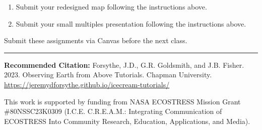 \documentclass[oneside,a4paper,11pt,explicit]{book}
\begin{document}
\begin{tcolorbox}[colback=yellow!5!white,colframe=IceCreamOrbit,title= \vspace{.2em} \Large Map of the Week Assignments]
	\large
	\begin{enumerate}
		\item Submit your redesigned map following the instructions above. 
		\item Submit your small multiples presentation following the instructions above. 
	\end{enumerate}
	Submit these assignments via Canvas before the next class.
\end{tcolorbox}


\hrule

\vspace{1em}

\small \textbf{Recommended Citation:} Forsythe, J.D., G.R. Goldsmith, and J.B. Fisher. 2023. Observing Earth from Above Tutorials. Chapman University. \url{https://jeremydforsythe.github.io/icecream-tutorials/}

\vspace{1em}

This work is supported by funding from NASA ECOSTRESS Mission Grant \#80NSSC23K0309 (I.C.E. C.R.E.A.M.: Integrating Communication of ECOSTRESS Into Community Research, Education, Applications, and Media).
\end{document}
